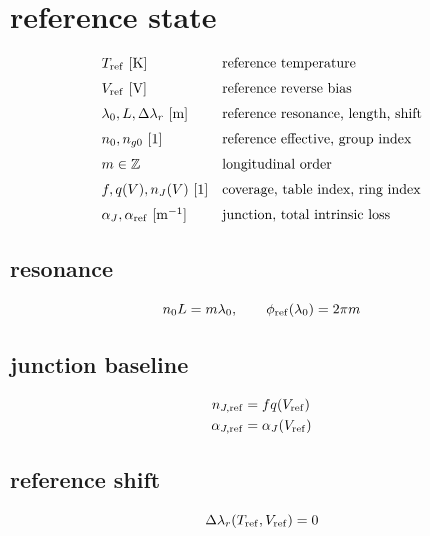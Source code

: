 \section*{reference state}
\[
\begin{array}{ll}T_{\rm ref}\ [\mathrm K]&\text{reference temperature}\\[0.6em]V_{\rm ref}\ [\mathrm V]&\text{reference reverse bias}\\[0.6em]\lambda_0,L,\Delta\lambda_r\ [\mathrm m]&\text{reference resonance, length, shift}\\[0.6em]n_0,n_{g0}\ [1]&\text{reference effective, group index}\\[0.6em]m\in\mathbb Z&\text{longitudinal order}\\[0.6em]f,q(V),n_J(V)\ [1]&\text{coverage, table index, ring index}\\[0.6em]\alpha_J,\alpha_{\rm ref}\ [\mathrm{m^{-1}}]&\text{junction, total intrinsic loss}\end{array}
\]
\subsection*{resonance}
\[
\displaystyle n_0L=m\lambda_0,\qquad\phi_{\rm ref}(\lambda_0)=2\pi m
\]
\subsection*{junction baseline}
\[
\displaystyle \begin{aligned}n_{J,\rm ref}&=f q(V_{\rm ref})\\\alpha_{J,\rm ref}&=\alpha_J(V_{\rm ref})\end{aligned}
\]
\subsection*{reference shift}
\[
\displaystyle \Delta\lambda_r(T_{\rm ref},V_{\rm ref})=0
\]
